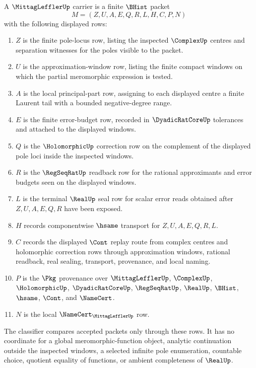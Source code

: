 \begin{definition}
\label{def:mittag-leffler-carrier}
A $\MittagLefflerUp$ carrier is a finite $\BHist$ packet
$$
M=(Z,U,A,E,Q,R,L,H,C,P,N)
$$
with the following displayed rows:
\begin{enumerate}
\item $Z$ is the finite pole-locus row, listing the inspected $\ComplexUp$ centres and separation witnesses for the poles visible to the packet.
\item $U$ is the approximation-window row, listing the finite compact windows on which the partial meromorphic expression is tested.
\item $A$ is the local principal-part row, assigning to each displayed centre a finite Laurent tail with a bounded negative-degree range.
\item $E$ is the finite error-budget row, recorded in $\DyadicRatCoreUp$ tolerances and attached to the displayed windows.
\item $Q$ is the $\HolomorphicUp$ correction row on the complement of the displayed pole loci inside the inspected windows.
\item $R$ is the $\RegSeqRatUp$ readback row for the rational approximants and error budgets seen on the displayed windows.
\item $L$ is the terminal $\RealUp$ seal row for scalar error reads obtained after $Z,U,A,E,Q,R$ have been exposed.
\item $H$ records componentwise $\hsame$ transport for $Z,U,A,E,Q,R,L$.
\item $C$ records the displayed $\Cont$ replay route from complex centres and holomorphic correction rows through approximation windows, rational readback, real sealing, transport, provenance, and local naming.
\item $P$ is the $\Pkg$ provenance over $\MittagLefflerUp$, $\ComplexUp$, $\HolomorphicUp$, $\DyadicRatCoreUp$, $\RegSeqRatUp$, $\RealUp$, $\BHist$, $\hsame$, $\Cont$, and $\NameCert$.
\item $N$ is the local $\NameCert_{\MittagLefflerUp}$ row.
\end{enumerate}
The classifier compares accepted packets only through these rows. It has no coordinate for a global meromorphic-function object, analytic continuation outside the inspected windows, a selected infinite pole enumeration, countable choice, quotient equality of functions, or ambient completeness of $\RealUp$.
\end{definition}

